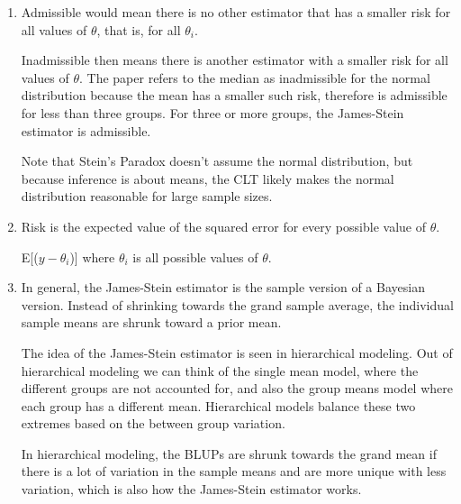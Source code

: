 \documentclass{article}\usepackage[]{graphicx}\usepackage[]{color}
\begin{document}
\begin{enumerate}
\item%

Admissible would mean there is no other estimator that has a smaller risk for all values of $\theta$, that is, for all $\theta_{i}$. 

Inadmissible then means there is another estimator with a smaller risk for all values of $\theta$. The paper refers to the median as inadmissible for the normal distribution because the mean has a smaller such risk, therefore is admissible for less than three groups. For three or more groups, the James-Stein estimator is admissible.

Note that Stein's Paradox doesn't assume the normal distribution, but because inference is about means, the CLT likely makes the normal distribution reasonable for large sample sizes.



\item%

Risk is the expected value of the squared error for every possible value of $\theta$. 


E[($y - \theta_{i}$)] where $\theta_{i}$ is all possible values of $\theta$.


\item %

In general, the James-Stein estimator is the sample version of a Bayesian version. Instead of shrinking towards the grand sample average, the individual sample means are shrunk toward a prior mean.

The idea of the James-Stein estimator is seen in hierarchical modeling. Out of hierarchical modeling we can think of the single mean model, where the different groups are not accounted for, and also the group means model where each group has a different mean. Hierarchical models balance these two extremes based on the between group variation.

In hierarchical modeling, the BLUPs are shrunk towards the grand mean if there is a lot of variation in the sample means and are more unique with less variation, which is also how the James-Stein estimator works. 



\end{enumerate}
\end{document}
